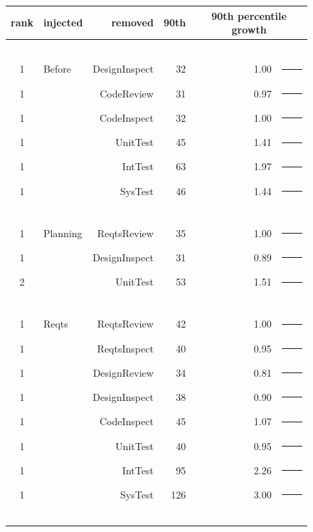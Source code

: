 \documentclass[smallcondensed]{svjour3}
\begin{document}
\begin{figure}[!t]
\begin{center}
\begin{tabular}{c|lr|r|rl}
  rank & injected & removed &   90th   &  \multicolumn{2}{c}{90th percentile growth} \\ 
\hline\multicolumn{6}{c}{~}  \\
1 &  Before   &   DesignInspect     & 32  &  1.00 & \textcolor{black}{\rule{10mm}{2mm}}\\
1 &   &   CodeReview      &   31   &    0.97 & \textcolor{black}{\rule{9mm}{2mm}}\\
1 &   &   CodeInspect     &   32   &    1.00 & \textcolor{black}{\rule{10mm}{2mm}}\\
1 &   &   UnitTest        &   45  &    1.41 & \textcolor{black}{\rule{14mm}{2mm}}\\
1 &   &   IntTest         &   63  &   1.97 & \textcolor{black}{\rule{19mm}{2mm}}\\
1 &   &   SysTest         &   46   &   1.44 & \textcolor{black}{\rule{14mm}{2mm}}\\  
\hline\multicolumn{6}{c}{~}  \\
1 &  Planning     &   ReqtsReview       & 35   &   1.00 & \textcolor{black}{\rule{10mm}{2mm}}\\
1 &               &   DesignInspect     & 31  &   0.89 & \textcolor{black}{\rule{8mm}{2mm}}\\
2 &               &   UnitTest          & 53 &   1.51 & \textcolor{black}{\rule{15mm}{2mm}}\\
\hline\multicolumn{6}{c}{~}  \\
1 &  Reqts   &   ReqtsReview      & 42 &    1.00 & \textcolor{black}{\rule{10mm}{2mm}}\\
1 &          &   ReqtsInspect      & 40 &     0.95 & \textcolor{black}{\rule{9mm}{2mm}}\\
1 &          &   DesignReview      & 34 &    0.81 & \textcolor{black}{\rule{8mm}{2mm}}\\
1 &          &   DesignInspect     & 38 &     0.90 & \textcolor{black}{\rule{9mm}{2mm}}\\
1 &          &   CodeInspect      & 45 &   1.07 & \textcolor{black}{\rule{10mm}{2mm}}\\
1 &          &   UnitTest          & 40 &   0.95 & \textcolor{black}{\rule{9mm}{2mm}}\\
1 &          &   IntTest          & 95 &      2.26 & \textcolor{black}{\rule{22mm}{2mm}}\\
1 &          &   SysTest          & 126 &    3.00 & \textcolor{black}{\rule{30mm}{2mm}}\\
\hline\multicolumn{6}{c}{~}  \\

\end{tabular}
\end{center}
\end{figure}
\end{document}
